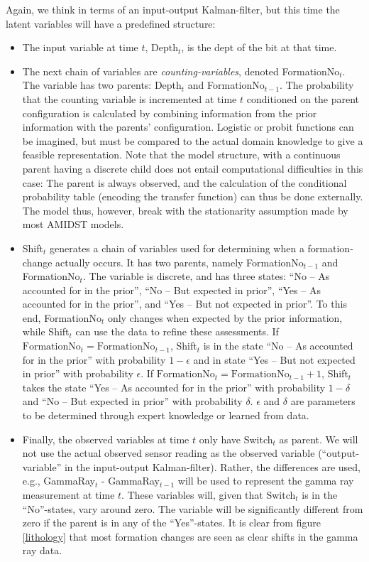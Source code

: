 Again, we think in terms of an input-output Kalman-filter, but this time the latent variables will have a predefined structure:
\begin{itemize}

\item The input variable at time $t$, Depth$_t$, is the dept of the bit at that time.

\item The next chain of variables are \textit{counting-variables}, denoted FormationNo$_t$. The variable has two parents: Depth$_t$ and FormationNo$_{t-1}$. 
The probability that the counting variable is incremented at time $t$ conditioned on the parent configuration is calculated by combining information from the prior information with the parents' configuration. Logistic or probit functions can  be imagined, but must be compared to the actual domain knowledge to give a feasible representation.
Note that the model structure, with  a continuous parent having a discrete child does not entail computational difficulties in this case: The parent is always observed, and the calculation of the conditional probability table (encoding the transfer function) can thus be done externally. The model thus, however, break with the stationarity assumption made by most  AMIDST models.
\item Shift$_t$  generates a  chain of variables used for determining when   a formation-change actually occurs. It has two parents, namely  FormationNo$_{t-1}$ and  FormationNo$_t$. 
The variable is discrete, and has three states: ``No -- As accounted for in the prior'', ``No -- But expected in prior'', ``Yes -- As accounted for in the prior'', and ``Yes -- But not expected in prior''. 
To this end, FormationNo$_t$ only changes when expected by the prior information, while Shift$_t$ can use the data to refine these assessments. If $\mbox{FormationNo}_{t}= \mbox{FormationNo}_{t-1}$, Shift$_t$ is in the state 
 ``No -- As accounted for in the prior'' with probability $1-\epsilon$ and in state ``Yes -- But not expected in prior'' with probability $\epsilon$. If $\mbox{FormationNo}_{ t}=\mbox{FormationNo}_{t-1}+1$, Shift$_t$ takes the state 
``Yes -- As accounted for in the prior'' with probability $1-\delta$ and ``No -- But expected in prior'' with probability $\delta$. $\epsilon$ and $\delta$ are parameters to be determined through expert knowledge or learned from data.

\item Finally, the observed variables at time $t$ only have  Switch$_t$ as parent. We will not use the actual observed sensor reading as the observed variable (``output-variable'' in the input-output Kalman-filter). Rather, the differences are used, e.g., GammaRay$_t$ - GammaRay$_{t-1}$ will be used to represent the gamma ray measurement at time $t$. These variables will, given that Switch$_t$ is in the ``No''-states, vary around zero. The variable will be significantly different from zero if the parent is in any of the ``Yes''-states.  It is clear from figure \ref{lithology} that most formation changes are seen as clear shifts in the gamma ray data.
\end{itemize}

